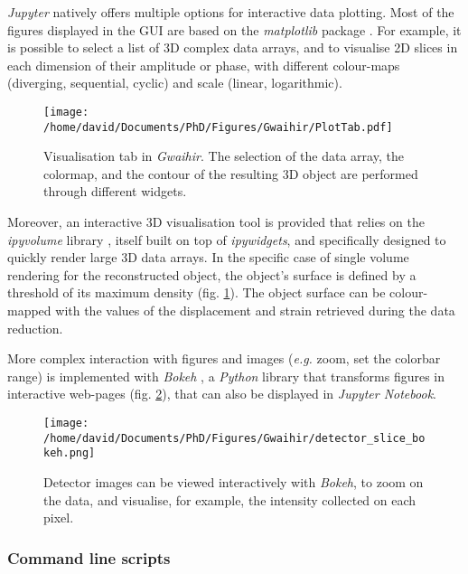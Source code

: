 \textit{Jupyter} natively offers multiple options for interactive data plotting.
Most of the figures displayed in the GUI are based on the \textit{matplotlib} package \parencite{Hunter2007}.
For example, it is possible to select a list of 3D complex data arrays, and to visualise 2D slices in each dimension of their amplitude or phase, with different colour-maps (diverging, sequential, cyclic) and scale (linear, logarithmic).

\begin{figure}[!htb]
    \centering
    \texttt{[image: /home/david/Documents/PhD/Figures/Gwaihir/PlotTab.pdf]}
    \caption{
    Visualisation tab in \textit{Gwaihir}.
    The selection of the data array, the colormap, and the contour of the resulting 3D object are performed through different widgets.
    }
    \label{fig:3D_object}
\end{figure}

Moreover, an interactive 3D visualisation tool is provided that relies on the \textit{ipyvolume} library \parencite{Breddeld2021}, itself built on top of \textit{ipywidgets}, and specifically designed to quickly render large 3D data arrays.
In the specific case of single volume rendering for the reconstructed object, the object's surface is defined by a threshold of its maximum density (fig. \ref{fig:3D_object}).
The object surface can be colour-mapped with the values of the displacement and strain retrieved during the data reduction.

More complex interaction with figures and images (\textit{e.g.} zoom, set the colorbar range) is implemented with \textit{Bokeh} \parencite{Bokeh}, a \textit{Python} library that transforms figures in interactive web-pages (fig. \ref{fig:BokehDetector}), that can also be displayed in \textit{Jupyter Notebook}.

\begin{figure}[!htb]
    \centering
    \texttt{[image: /home/david/Documents/PhD/Figures/Gwaihir/detector\_slice\_bokeh.png]}
    \caption{
    Detector images can be viewed interactively with \textit{Bokeh}, to zoom on the data, and visualise, for example, the intensity collected on each pixel.
    }
    \label{fig:BokehDetector}
\end{figure}

\subsubsection{Command line scripts}

